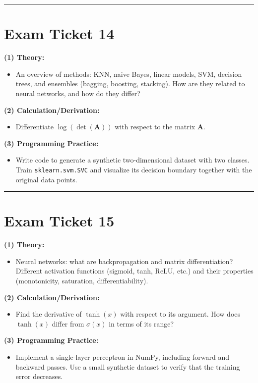 \documentclass[a4paper,12pt]{article}
\begin{document}
\noindent\rule{\textwidth}{0.4pt}
\newpage

\section*{Exam Ticket 14}
\textbf{(1) Theory:}
\begin{itemize}
  \item An overview of methods: KNN, naive Bayes, linear models, SVM, decision trees, and ensembles (bagging, boosting, stacking). How are they related to neural networks, and how do they differ?
\end{itemize}

\textbf{(2) Calculation/Derivation:}
\begin{itemize}
  \item Differentiate $\log(\det(\mathbf{A}))$ with respect to the matrix $\mathbf{A}$.
\end{itemize}

\textbf{(3) Programming Practice:}
\begin{itemize}
  \item Write code to generate a synthetic two-dimensional dataset with two classes. Train \texttt{sklearn.svm.SVC} and visualize its decision boundary together with the original data points.
\end{itemize}

\noindent\rule{\textwidth}{0.4pt}
\newpage

\section*{Exam Ticket 15}
\textbf{(1) Theory:}
\begin{itemize}
  \item Neural networks: what are backpropagation and matrix differentiation? Different activation functions (sigmoid, tanh, ReLU, etc.) and their properties (monotonicity, saturation, differentiability).
\end{itemize}

\textbf{(2) Calculation/Derivation:}
\begin{itemize}
  \item Find the derivative of $\tanh(x)$ with respect to its argument. How does $\tanh(x)$ differ from $\sigma(x)$ in terms of its range?
\end{itemize}

\textbf{(3) Programming Practice:}
\begin{itemize}
  \item Implement a single-layer perceptron in NumPy, including forward and backward passes. Use a small synthetic dataset to verify that the training error decreases.
\end{itemize}
\end{document}
